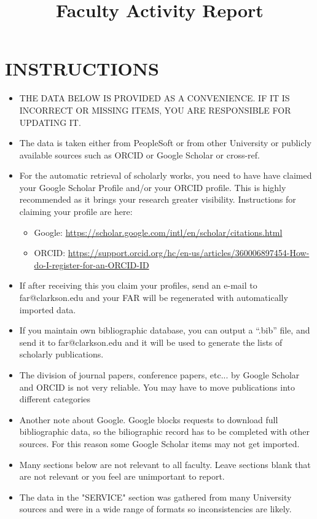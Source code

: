 \documentclass[10pt]{article}
\title{Faculty Activity Report}
\author{}
\begin{document}
\maketitle

\section{INSTRUCTIONS}
\begin{itemize}
\item THE DATA BELOW IS PROVIDED AS A CONVENIENCE.  IF IT IS INCORRECT OR MISSING ITEMS, YOU ARE RESPONSIBLE FOR UPDATING IT.
\item The data is taken either from PeopleSoft or from other University or publicly available sources such as ORCID or Google Scholar or cross-ref.
\item For the automatic retrieval of scholarly works, you need to have have claimed your Google Scholar Profile and/or your ORCID profile.  This is highly recommended as it brings your research greater visibility.  Instructions for claiming your profile are here:
\begin{itemize}
\item Google: \url{https://scholar.google.com/intl/en/scholar/citations.html}
\item ORCID: \url{https://support.orcid.org/hc/en-us/articles/360006897454-How-do-I-register-for-an-ORCID-ID}
\end{itemize}
\item If after receiving this you claim your profiles, send an e-mail to far@clarkson.edu and your FAR will be regenerated with automatically imported data.
\item If you  maintain own bibliographic database, you can output a ``.bib'' file, and send it to far@clarkson.edu and it will be used to generate the lists of scholarly publications.
\item The division of journal papers, conference papers, etc...  by Google Scholar and ORCID  is not very reliable.  You may have to move publications into different categories
\item Another note about Google.  Google blocks requests to download full bibliographic data, so the biliographic record has to be completed with other sources.  For this reason some Google Scholar items may not get imported.
\item Many sections below are not relevant to all faculty.  Leave sections blank that are not relevant or you feel are unimportant to report. 
\item The data in the "SERVICE" section was gathered from many University sources and were in a wide range of formats so inconsistencies are likely.

\end{itemize}
\end{document}
